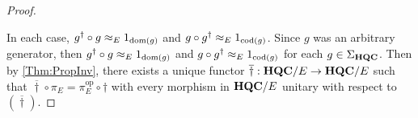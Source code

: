 \begin{proof}
\begin{enumerate}
    \end{enumerate}
    In each case, $g^\dagger \circ g \approx_E 1_{\operatorname{dom}(g)}$ and $g \circ g^\dagger \approx_E 1_{\operatorname{cod}(g)}$.
    Since $g$ was an arbitrary generator, then $g^\dagger \circ g \approx_E 1_{\operatorname{dom}(g)}$ and $g \circ g^\dagger \approx_E 1_{\operatorname{cod}(g)}$ for each $g \in \Sigma_{\mathbf{HQC}}$.
    Then by \cref{Thm:PropInv}, there exists a unique functor $\overline{\dagger}: \mathbf{HQC} / E \to \mathbf{HQC} / E$ such that $\overline{\dagger} \circ \pi_E = \pi_E^{\text{op}} \circ \dagger$ with every morphism in $\mathbf{HQC} / E$ unitary with respect to $( \overline{\dagger} )$.
\end{proof}